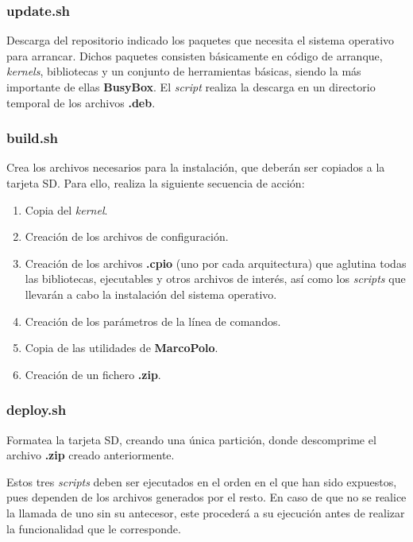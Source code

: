 \documentclass{article}
\begin{document}
\subsubsection*{update.sh}

Descarga del repositorio indicado los paquetes que necesita el sistema operativo para arrancar. Dichos paquetes consisten básicamente en código de arranque, \textit{kernels}, bibliotecas y un conjunto de herramientas básicas, siendo la más importante de ellas \textbf{BusyBox}. El \textit{script} realiza la descarga en un directorio temporal de los archivos \textbf{.deb}.

\subsubsection*{build.sh}

Crea los archivos necesarios para la instalación, que deberán ser copiados a la tarjeta SD. Para ello, realiza la siguiente secuencia de acción:

\begin{enumerate}
\item Copia del \textit{kernel}.
\item Creación de los archivos de configuración.
\item Creación de los archivos \textbf{.cpio} (uno por cada arquitectura) que aglutina todas las bibliotecas, ejecutables y otros archivos de interés, así como los \textit{scripts} que llevarán a cabo la instalación del sistema operativo. 
\item Creación de los parámetros de la línea de comandos.
\item Copia de las utilidades de \textbf{MarcoPolo}.
\item Creación de un fichero \textbf{.zip}.
\end{enumerate}

\subsubsection*{deploy.sh}

Formatea la tarjeta SD, creando una única partición, donde descomprime el archivo \textbf{.zip} creado anteriormente.

Estos tres \textit{scripts} deben ser ejecutados en el orden en el que han sido expuestos, pues dependen de los archivos generados por el resto. En caso de que no se realice la llamada de uno sin su antecesor, este procederá a su ejecución antes de realizar la funcionalidad que le corresponde.
\end{document}
